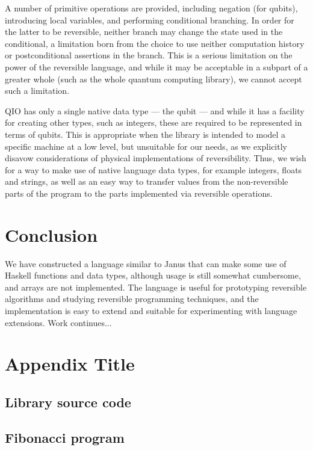 \documentclass[10pt]{sigplanconf}
\begin{document}
A number of primitive operations are provided, including negation (for
qubits), introducing local variables, and performing conditional
branching.  In order for the latter to be reversible, neither branch
may change the state used in the conditional, a limitation born from
the choice to use neither computation history or postconditional
assertions in the branch.  This is a serious limitation on the power
of the reversible language, and while it may be acceptable in a
subpart of a greater whole (such as the whole quantum computing
library), we cannot accept such a limitation.

QIO has only a single native data type --- the qubit --- and while it
has a facility for creating other types, such as integers, these are
required to be represented in terms of qubits.  This is appropriate
when the library is intended to model a specific machine at a low
level, but unsuitable for our needs, as we explicitly disavow
considerations of physical implementations of reversibility.  Thus, we
wish for a way to make use of native language data types, for example
integers, floats and strings, as well as an easy way to transfer
values from the non-reversible parts of the program to the parts
implemented via reversible operations.

\section{Conclusion}

We have constructed a language similar to Janus that can make some use
of Haskell functions and data types, although usage is still somewhat
cumbersome, and arrays are not implemented.  The language is useful
for prototyping reversible algorithms and studying reversible
programming techniques, and the implementation is easy to extend and
suitable for experimenting with language extensions.  Work
continues...







\appendix
\section{Appendix Title}

\subsection{Library source code}

\tiny{

}


\subsection{Fibonacci program}

\tiny{

}
\end{document}
